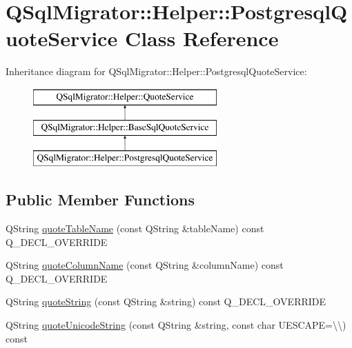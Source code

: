 \hypertarget{class_q_sql_migrator_1_1_helper_1_1_postgresql_quote_service}{}\section{Q\+Sql\+Migrator\+:\+:Helper\+:\+:Postgresql\+Quote\+Service Class Reference}
\label{class_q_sql_migrator_1_1_helper_1_1_postgresql_quote_service}
Inheritance diagram for Q\+Sql\+Migrator\+:\+:Helper\+:\+:Postgresql\+Quote\+Service\+:\begin{figure}[H]
\begin{center}
\leavevmode
\includegraphics[height=3.000000cm]{class_q_sql_migrator_1_1_helper_1_1_postgresql_quote_service}
\end{center}
\end{figure}
\subsection*{Public Member Functions}
\begin{DoxyCompactItemize}
\item 
Q\+String \hyperlink{class_q_sql_migrator_1_1_helper_1_1_postgresql_quote_service_a56541b2bbc99faae890a9a21d50e14f6}{quote\+Table\+Name} (const Q\+String \&table\+Name) const Q\+\_\+\+D\+E\+C\+L\+\_\+\+O\+V\+E\+R\+R\+I\+DE
\item 
Q\+String \hyperlink{class_q_sql_migrator_1_1_helper_1_1_postgresql_quote_service_af54cb8f1749e470e2ea8794fb58896c8}{quote\+Column\+Name} (const Q\+String \&column\+Name) const Q\+\_\+\+D\+E\+C\+L\+\_\+\+O\+V\+E\+R\+R\+I\+DE
\item 
Q\+String \hyperlink{class_q_sql_migrator_1_1_helper_1_1_postgresql_quote_service_aea4456a2d9ae05fbc1bb653dfcb6571f}{quote\+String} (const Q\+String \&string) const Q\+\_\+\+D\+E\+C\+L\+\_\+\+O\+V\+E\+R\+R\+I\+DE
\item 
Q\+String \hyperlink{class_q_sql_migrator_1_1_helper_1_1_postgresql_quote_service_a2cfc19b12c27e2e90c9db5a3680e6fac}{quote\+Unicode\+String} (const Q\+String \&string, const char U\+E\+S\+C\+A\+PE=\textquotesingle{}\textbackslash{}\textbackslash{}\textquotesingle{}) const
\end{DoxyCompactItemize}


